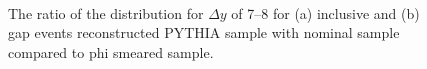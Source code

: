\begin{figure}
\centering
\mbox{
              \quad
              \quad
                              }
\caption[]{
The ratio of the \dphi{} distribution for $\Delta y$ of 7--8 for (a) inclusive and (b) gap events reconstructed PYTHIA sample with nominal sample compared to phi smeared sample.
\label{GBJ2:ResoPhi:dphi78}}
\end{figure}


